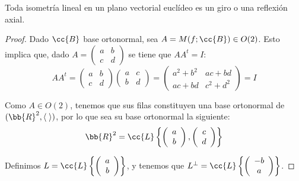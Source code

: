 \begin{teo}
    Toda isometría lineal en un plano vectorial euclídeo es un giro o una reflexión axial.
\end{teo}
\begin{proof}
    Dado $\cc{B}$ base ortonormal, sea $A=M(f;\cc{B}) \in O(2)$. Esto implica que, dado $A=\left(\begin{array}{cc}
            a & b \\
            c & d
        \end{array}\right)$ se tiene que $AA^t = I$:
    \begin{equation*}
        AA^t = \left(\begin{array}{cc}
            a & b \\
            c & d
        \end{array}\right)\left(\begin{array}{cc}
            a & c \\
            b & d
        \end{array}\right) = 
        \left(\begin{array}{cc}
            a^2+b^2 & ac+bd \\
            ac + bd & c^2+d^2
        \end{array}\right) = I
    \end{equation*}

    
    Como $A\in O(2)$, tenemos que sus filas constituyen una base ortonormal de $(\bb{R}^2, \langle\;\rangle)$, por lo que sea su base ortonormal la siguiente:
    \begin{equation*}
        \bb{R}^2 = \cc{L}\left\{
        \left(\begin{array}{c}
            a \\ b
        \end{array}\right),
        \left(\begin{array}{c}
            c \\ d
        \end{array}\right)\right\}
    \end{equation*}
    
    Definimos $L=\cc{L}\left\{\left(\begin{array}{c}
            a \\ b
        \end{array}\right)\right\}$, y tenemos que $L^\perp=\cc{L}\left\{\left(\begin{array}{c}
            -b \\ a
        \end{array}\right)\right\}$.
        

\end{proof}
